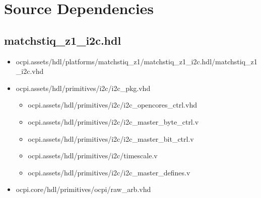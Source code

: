 \documentclass{article}
\def\comp{matchstiq\_z1\_i2c}
\begin{document}
\section*{Source Dependencies}
\subsection*{\comp.hdl}
\begin{itemize}
	\item ocpi.assets/hdl/platforms/matchstiq\_z1/\comp.hdl/\comp.vhd
	\item ocpi.assets/hdl/primitives/i2c/i2c\_pkg.vhd
	      \begin{itemize}
	      	\item ocpi.assets/hdl/primitives/i2c/i2c\_opencores\_ctrl.vhd
	      	\item ocpi.assets/hdl/primitives/i2c/i2c\_master\_byte\_ctrl.v
	      	\item ocpi.assets/hdl/primitives/i2c/i2c\_master\_bit\_ctrl.v
	      	\item ocpi.assets/hdl/primitives/i2c/timescale.v
	      	\item ocpi.assets/hdl/primitives/i2c/i2c\_master\_defines.v
	      \end{itemize}
	\item ocpi.core/hdl/primitives/ocpi/raw\_arb.vhd
\end{itemize}
\end{document}
